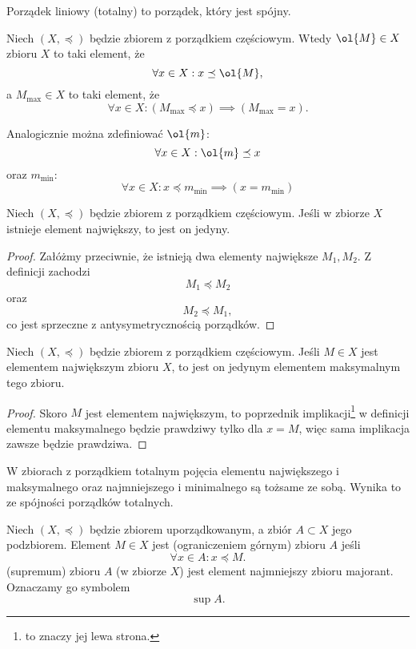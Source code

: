 \begin{definition}
    Porządek liniowy (totalny) to porządek, który jest spójny.
\end{definition}

Niech $(X, \preceq)$ będzie zbiorem z porządkiem częściowym. Wtedy  $\ol{M} \in X$ zbioru $X$ to taki element, że
$$ \forall x \in X : x \preceq \ol{M}, $$
a  $M_{\max} \in X$ to taki element, że
$$ \forall x \in X : (M_{\max} \preceq x) \implies (M_{\max} = x). $$

\begin{remark}
    Analogicznie można zdefiniować  $\ol{m}$:
    $$ \forall x \in X : \ol{m} \preceq x $$
    oraz  $m_{\min}$:
    $$ \forall x \in X : x \preceq m_{\min} \implies (x = m_{\min}) $$
\end{remark}

\begin{theorem}
    \label{t:uniq_greatest}
    Niech $(X, \preceq)$ będzie zbiorem z porządkiem częściowym. Jeśli w zbiorze $X$ istnieje element największy, to jest on jedyny.
\end{theorem}
\begin{proof}
    Załóżmy przeciwnie, że istnieją dwa elementy największe $M_1, M_2$. Z definicji zachodzi
    $$ M_1 \preceq M_2 $$
    oraz
    $$ M_2 \preceq M_1, $$
    co jest sprzeczne z antysymetrycznością porządków.
\end{proof}

\begin{theorem}
    Niech $(X, \preceq)$ będzie zbiorem z porządkiem częściowym. Jeśli $M \in X$ jest elementem największym zbioru $X$, to jest on jedynym elementem maksymalnym tego zbioru.
\end{theorem}
\begin{proof}
    Skoro $M$ jest elementem największym, to poprzednik implikacji\footnote{to znaczy jej lewa strona.} w definicji elementu maksymalnego będzie prawdziwy tylko dla $x = M$, więc sama implikacja zawsze będzie prawdziwa.
\end{proof}

\begin{fact}
    \label{f:greatest=maximal}
    W zbiorach z porządkiem totalnym pojęcia elementu największego i maksymalnego oraz najmniejszego i minimalnego są tożsame ze sobą. Wynika to ze spójności porządków totalnych.
\end{fact}

Niech $(X, \preceq)$ będzie zbiorem uporządkowanym, a zbiór $A \subset X$ jego podzbiorem. Element $M \in X$ jest  (ograniczeniem górnym) zbioru $A$ jeśli
$$ \forall x \in A : x \preceq M. $$
 (supremum) zbioru $A$ (w zbiorze $X$) jest element najmniejszy zbioru majorant. Oznaczamy go symbolem $$\sup A.$$

